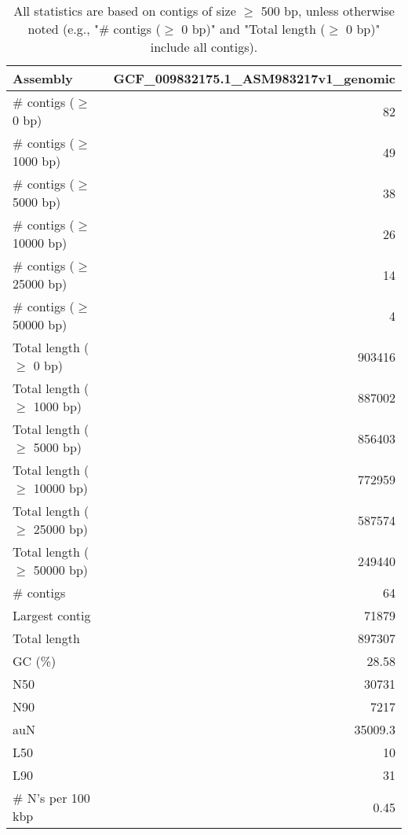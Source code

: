 \documentclass[12pt,a4paper]{article}
\begin{document}
\begin{table}[ht]
\begin{center}
\caption{All statistics are based on contigs of size $\geq$ 500 bp, unless otherwise noted (e.g., "\# contigs ($\geq$ 0 bp)" and "Total length ($\geq$ 0 bp)" include all contigs).}
\begin{tabular}{|l*{1}{|r}|}
\hline
Assembly & GCF\_009832175.1\_ASM983217v1\_genomic \\ \hline
\# contigs ($\geq$ 0 bp) & 82 \\ \hline
\# contigs ($\geq$ 1000 bp) & 49 \\ \hline
\# contigs ($\geq$ 5000 bp) & 38 \\ \hline
\# contigs ($\geq$ 10000 bp) & 26 \\ \hline
\# contigs ($\geq$ 25000 bp) & 14 \\ \hline
\# contigs ($\geq$ 50000 bp) & 4 \\ \hline
Total length ($\geq$ 0 bp) & 903416 \\ \hline
Total length ($\geq$ 1000 bp) & 887002 \\ \hline
Total length ($\geq$ 5000 bp) & 856403 \\ \hline
Total length ($\geq$ 10000 bp) & 772959 \\ \hline
Total length ($\geq$ 25000 bp) & 587574 \\ \hline
Total length ($\geq$ 50000 bp) & 249440 \\ \hline
\# contigs & 64 \\ \hline
Largest contig & 71879 \\ \hline
Total length & 897307 \\ \hline
GC (\%) & 28.58 \\ \hline
N50 & 30731 \\ \hline
N90 & 7217 \\ \hline
auN & 35009.3 \\ \hline
L50 & 10 \\ \hline
L90 & 31 \\ \hline
\# N's per 100 kbp & 0.45 \\ \hline
\end{tabular}
\end{center}
\end{table}
\end{document}
